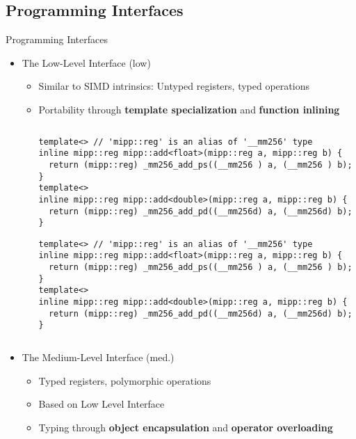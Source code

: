 \subsection[Programming Interfaces]{Programming Interfaces}

\begin{frame}{Programming Interfaces}
  \begin{itemize}
    \item The Low-Level \MIPP Interface (low)
    \begin{itemize}
      \item Similar to SIMD intrinsics: \textcolor{Paired-5}{Untyped} registers, \textcolor{Paired-5}{typed} operations
      \item Portability through \textbf{template specialization} and \textbf{function inlining}
      \begin{columns}[t]
        \begin{column}[T]{10.5cm}
        \vspace{-1mm}
        \begin{overprint}
        \begin{verbatim}
template<> // 'mipp::reg' is an alias of '__mm256' type
inline mipp::reg mipp::add<float>(mipp::reg a, mipp::reg b) {
  return (mipp::reg) _mm256_add_ps((__mm256 ) a, (__mm256 ) b);
}
template<>
inline mipp::reg mipp::add<double>(mipp::reg a, mipp::reg b) {
  return (mipp::reg) _mm256_add_pd((__mm256d) a, (__mm256d) b);
}
        \end{verbatim}
        \begin{verbatim}
template<> // 'mipp::reg' is an alias of '__mm256' type
inline mipp::reg mipp::add<float>(mipp::reg a, mipp::reg b) {
  return (mipp::reg) _mm256_add_ps((__mm256 ) a, (__mm256 ) b);
}
template<>
inline mipp::reg mipp::add<double>(mipp::reg a, mipp::reg b) {
  return (mipp::reg) _mm256_add_pd((__mm256d) a, (__mm256d) b);
}
        \end{verbatim}
        \end{overprint}
      \end{column}
      \end{columns}
    \end{itemize}
  \end{itemize}
  \vspace{0.3cm}
  \pause
  \begin{itemize}
    \item The Medium-Level \MIPP Interface (med.)
    \begin{itemize}
      \item \textcolor{Paired-5}{Typed} registers, \textcolor{Paired-5}{polymorphic} operations
      \item Based on \MIPP Low Level Interface
      \item Typing through \textbf{object encapsulation} and \textbf{operator overloading}
    \end{itemize}
  \end{itemize}
  \vfill
\end{frame}

